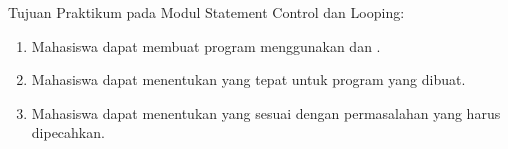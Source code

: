 \documentclass[../main.tex]{subfiles}
\begin{document}
    \noindent Tujuan Praktikum pada Modul {\thechapter} Statement Control dan Looping:
    \begin{enumerate}
        \item Mahasiswa dapat membuat program menggunakan {\statement} {\control} dan {\looping}.
        \item Mahasiswa dapat menentukan {\statement} {\control} yang tepat untuk program yang dibuat.
        \item Mahasiswa dapat menentukan {\statement} {\looping} yang sesuai dengan permasalahan yang harus dipecahkan.
    \end{enumerate}
\end{document}
